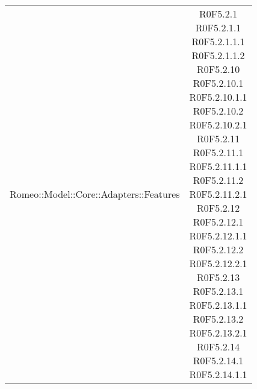 \begin{center}
\begin{longtable}{|c|c|}
\parbox[t]{\larghezza}{Romeo::Model::Core::Adapters::Features}   & \parbox[t]{\larghezza}{ R0F5.2.1 \\ R0F5.2.1.1 \\ R0F5.2.1.1.1 \\ R0F5.2.1.1.2 \\ R0F5.2.10 \\ R0F5.2.10.1 \\ R0F5.2.10.1.1 \\ R0F5.2.10.2 \\ R0F5.2.10.2.1 \\ R0F5.2.11 \\ R0F5.2.11.1 \\ R0F5.2.11.1.1 \\ R0F5.2.11.2 \\ R0F5.2.11.2.1 \\ R0F5.2.12 \\ R0F5.2.12.1 \\ R0F5.2.12.1.1 \\ R0F5.2.12.2 \\ R0F5.2.12.2.1 \\ R0F5.2.13 \\ R0F5.2.13.1 \\ R0F5.2.13.1.1 \\ R0F5.2.13.2 \\ R0F5.2.13.2.1 \\ R0F5.2.14 \\ R0F5.2.14.1 \\ R0F5.2.14.1.1 \\  }\\

\end{longtable}
\end{center}
